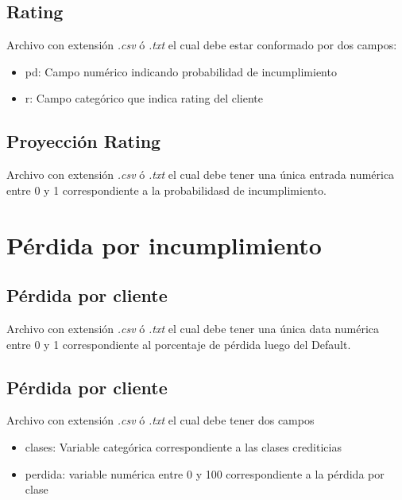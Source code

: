 \documentclass[
  12pt,
]{krantz}
\providecommand{\tightlist}{%
  \setlength{\itemsep}{0pt}\setlength{\parskip}{0pt}}
\theoremstyle{definition}
\theoremstyle{definition}
\theoremstyle{definition}
\theoremstyle{remark}
\begin{document}
\hypertarget{rating-1}{%
\subsection{Rating}\label{rating-1}}

Archivo con extensión \emph{.csv} ó \emph{.txt} el cual debe estar conformado por dos campos:

\begin{itemize}
\tightlist
\item
  pd: Campo numérico indicando probabilidad de incumplimiento
\item
  r: Campo categórico que indica rating del cliente
\end{itemize}

\hypertarget{proyeccion-rating-1}{%
\subsection{Proyección Rating}\label{proyeccion-rating-1}}

Archivo con extensión \emph{.csv} ó \emph{.txt} el cual debe tener una única entrada numérica entre 0 y 1 correspondiente a la probabilidasd de incumplimiento.

\hypertarget{perdida-por-incumplimiento-2}{%
\section{Pérdida por incumplimiento}\label{perdida-por-incumplimiento-2}}

\hypertarget{perdida-por-cliente-1}{%
\subsection{Pérdida por cliente}\label{perdida-por-cliente-1}}

Archivo con extensión \emph{.csv} ó \emph{.txt} el cual debe tener una única data numérica entre 0 y 1 correspondiente al porcentaje de pérdida luego del Default.

\hypertarget{perdida-por-cliente-2}{%
\subsection{Pérdida por cliente}\label{perdida-por-cliente-2}}

Archivo con extensión \emph{.csv} ó \emph{.txt} el cual debe tener dos campos

\begin{itemize}
\item
  clases: Variable categórica correspondiente a las clases crediticias
\item
  perdida: variable numérica entre 0 y 100 correspondiente a la pérdida por clase
\end{itemize}
\end{document}
